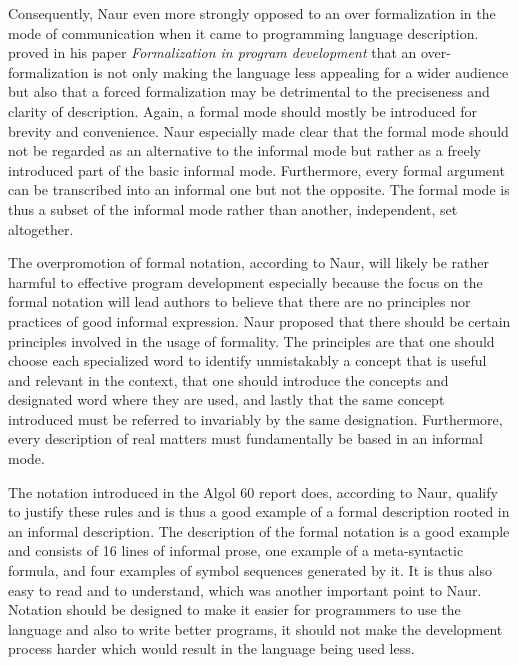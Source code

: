 \documentclass{article}
\begin{document}
Consequently, Naur even more strongly opposed to an over formalization in the mode of communication when it came to programming language description. \cite{naur1982formalization} proved in his paper \textit{Formalization in program development} that an over-formalization is not only making the language less appealing for a wider audience but also that a forced formalization may be detrimental to the preciseness and clarity of description. Again, a formal mode should mostly be introduced for brevity and convenience. Naur especially made clear that the formal mode should not be regarded as an alternative to the informal mode but rather as a freely introduced part of the basic informal mode. Furthermore, every formal argument can be transcribed into an informal one but not the opposite. The formal mode is thus a subset of the informal mode rather than another, independent, set altogether. 

The overpromotion of formal notation, according to Naur, will likely be rather harmful to effective program development especially because the focus on the formal notation will lead authors to believe that there are no principles nor practices of good informal expression. Naur proposed that there should be certain principles involved in the usage of formality. The principles are that one should choose each specialized word to identify unmistakably a concept that is useful and relevant in the context, that one should introduce the concepts and designated word where they are used, and lastly that the same concept introduced must be referred to invariably by the same designation. Furthermore, every description of real matters must fundamentally be based in an informal mode.

The notation introduced in the Algol 60 report does, according to Naur, qualify to justify these rules and is thus a good example of a formal description rooted in an informal description. The description of the formal notation is a good example and consists of 16 lines of informal prose, one example of a meta-syntactic formula, and four examples of symbol sequences generated by it. It is thus also easy to read and to understand, which was another important point to Naur. Notation should be designed to make it easier for programmers to use the language and also to write better programs, it should not make the development process harder which would result in the language being used less.
\end{document}
